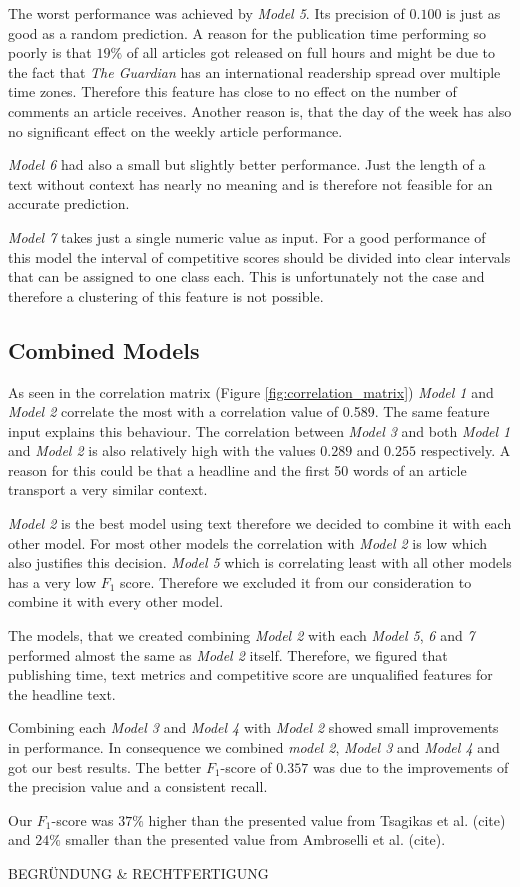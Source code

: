 The worst performance was achieved by \textit{Model 5}. Its precision of $0.100$ is just as good as a random prediction. A reason for the publication time performing so poorly is that $19\%$ of all articles got released on full hours and might be due to the fact that \textit{The Guardian} has an international readership spread over multiple time zones. Therefore this feature has close to no effect on the number of comments an article receives. Another reason is, that the day of the week has also no significant effect on the weekly article performance.

\textit{Model 6} had also a small but slightly better performance. Just the length of a text without context has nearly no meaning and is therefore not feasible for an accurate prediction.

\textit{Model 7} takes just a single numeric value as input. For a good performance of this model the interval of competitive scores should be divided into clear intervals that can be assigned to one class each. This is unfortunately not the case and therefore a clustering of this feature is not possible.



\subsection{Combined Models}
As seen in the correlation matrix (Figure \ref{fig:correlation_matrix}) \textit{Model 1} and \textit{Model 2} correlate the most with a correlation value of 0.589. The same feature input explains this behaviour. The correlation between \textit{Model 3} and both \textit{Model 1} and \textit{Model 2} is also relatively high with the values $0.289$ and $0.255$ respectively. A reason for this could be that a headline and the first 50 words of an article transport a very similar context.

\textit{Model 2} is the best model using text therefore we decided to combine it with each other model. For most other models the correlation with \textit{Model 2} is low which also justifies this decision.
\textit{Model 5} which is correlating least with all other models has a very low $F_1$ score. Therefore we excluded it from our consideration to combine it with every other model.

The models, that we created combining \textit{Model 2} with each \textit{Model 5}, \textit{6} and \textit{7} performed almost the same as \textit{Model 2} itself. Therefore, we figured that publishing time, text metrics and competitive score are unqualified features for the headline text.

Combining each \textit{Model 3} and \textit{Model 4} with \textit{Model 2} showed small improvements in performance. In consequence we combined \textit{model 2}, \textit{Model 3} and \textit{Model 4} and got our best results. The better $F_1$-score of $0.357$ was due to the improvements of the precision value and a consistent recall.

Our $F_1$-score was $37\%$ higher than the presented value from Tsagikas et al. (cite) and $24\%$ smaller than the presented value from Ambroselli et al. (cite).

BEGRÜNDUNG \& RECHTFERTIGUNG

